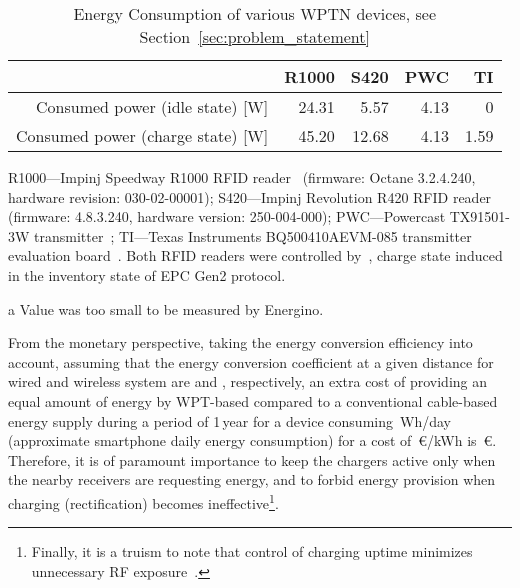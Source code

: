 \documentclass[11pt,draftclsnofoot,journal,onecolumn]{IEEEtran}
\begin{document}
\begin{table}
\centering
\caption{Energy Consumption of various WPTN devices, see Section~\ref{sec:problem_statement}}
\label{table:wptn_energy_consumption}
\begin{threeparttable}
\scriptsize
\begin{tabular}{| r | r | r | r | r |}
\hline
~ & R1000 & S420 & PWC & TI \\
\hline\hline
Consumed power (idle state) [W] & 24.31 & 5.57 & 4.13 & 0\tnote{a}\\
\hline
Consumed power (charge state) [W] & 45.20 & 12.68 & 4.13 & 1.59\\
\hline
\end{tabular}
\begin{tablenotes}
\scriptsize \item R1000---Impinj Speedway R1000 RFID reader~\cite{r1000_data_sheet} (firmware: Octane 3.2.4.240, hardware revision: 030-02-00001); S420---Impinj Revolution R420 RFID reader~\cite{s420_data_sheet} (firmware: 4.8.3.240, hardware version: 250-004-000); PWC---Powercast TX91501-3W transmitter~\cite[/products/powercaster-transmitters]{powercast_website}; TI---Texas Instruments BQ500410AEVM-085 transmitter evaluation board~\cite[/product/bq500410a]{ti_website}. Both RFID readers were controlled by~\cite{sllrp_github}, charge state induced in the inventory state of EPC Gen2 protocol.
\item[a] Value was too small to be measured by Energino.
\end{tablenotes}
\end{threeparttable}
\end{table}

From the monetary perspective, taking the energy conversion efficiency into account, assuming that the energy conversion coefficient at a given distance for wired and wireless system are  and , respectively, an extra cost of providing an equal amount of energy by WPT-based compared to a conventional cable-based energy supply during a period of 1\,year for a device consuming \,Wh/day (approximate smartphone daily energy consumption) for a cost of \,\euro/kWh is \,\euro. Therefore, it is of paramount importance to keep the chargers active only when the nearby receivers are requesting energy, and to forbid energy provision when charging (rectification) becomes ineffective\footnote{Finally, it is a truism to note that control of charging uptime minimizes unnecessary RF exposure~\cite[Sec. IX-H]{lu_arxiv_2014}.}.
\end{document}
